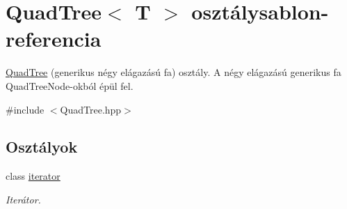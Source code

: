 \hypertarget{class_quad_tree}{\section{Quad\-Tree$<$ T $>$ osztálysablon-\/referencia}
\label{class_quad_tree}
}


\hyperlink{class_quad_tree}{Quad\-Tree} (generikus négy elágazású fa) osztály. A négy elágazású generikus fa Quad\-Tree\-Node-\/okból épül fel.  




{\ttfamily \#include $<$Quad\-Tree.\-hpp$>$}

\subsection*{Osztályok}
\begin{DoxyCompactItemize}
\item 
class \hyperlink{class_quad_tree_1_1iterator}{iterator}
\begin{DoxyCompactList}\small\item\em Iterátor. \end{DoxyCompactList}\end{DoxyCompactItemize}
